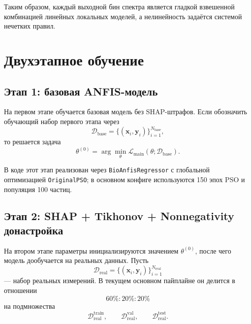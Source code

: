 \documentclass[11pt]{article}
\begin{document}
Таким образом, каждый выходной бин спектра является гладкой взвешенной комбинацией линейных локальных моделей, а нелинейность задаётся системой нечетких правил.

\section{Двухэтапное обучение}

\subsection{Этап 1: базовая ANFIS-модель}

На первом этапе обучается базовая модель без SHAP-штрафов. Если обозначить обучающий набор первого этапа через
\begin{equation}
\mathcal{D}_{\mathrm{base}} = \{(\mathbf{x}_i, \mathbf{y}_i)\}_{i=1}^{N_{\mathrm{base}}},
\end{equation}
то решается задача
\begin{equation}
\theta^{(0)} = \arg\min_{\theta} \mathcal{L}_{\mathrm{main}}(\theta; \mathcal{D}_{\mathrm{base}}).
\end{equation}

В коде этот этап реализован через \texttt{BioAnfisRegressor} с глобальной оптимизацией \texttt{OriginalPSO}; в основном конфиге используются 150 эпох PSO и популяция 100 частиц.

\subsection{Этап 2: SHAP + Tikhonov + Nonnegativity донастройка}

На втором этапе параметры инициализируются значением $\theta^{(0)}$, после чего модель дообучается на реальных данных. Пусть
\begin{equation}
\mathcal{D}_{\mathrm{real}} = \{(\mathbf{x}_i, \mathbf{y}_i)\}_{i=1}^{N_{\mathrm{real}}}
\end{equation}
--- набор реальных измерений. В текущем основном пайплайне он делится в отношении
\begin{equation}
60\% : 20\% : 20\%
\end{equation}
на подмножества
\begin{equation}
\mathcal{D}_{\mathrm{real}}^{\mathrm{train}},
\qquad
\mathcal{D}_{\mathrm{real}}^{\mathrm{val}},
\qquad
\mathcal{D}_{\mathrm{real}}^{\mathrm{test}}.
\end{equation}
\end{document}
